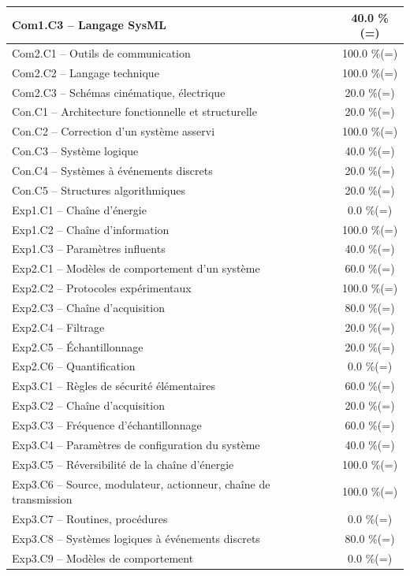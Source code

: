 \begin{center}
\begin{tabular}{|p{.7\linewidth}|c|}
Com1.C3 -- Langage SysML&40.0 \%(=)\\ \hline 
Com2.C1 -- Outils de communication&100.0 \%(=)\\ \hline 
Com2.C2 -- Langage technique&100.0 \%(=)\\ \hline 
Com2.C3 -- Schémas cinématique, électrique&20.0 \%(=)\\ \hline 
Con.C1 -- Architecture fonctionnelle et structurelle&20.0 \%(=)\\ \hline 
Con.C2 -- Correction d’un système asservi&100.0 \%(=)\\ \hline 
Con.C3 -- Système logique&40.0 \%(=)\\ \hline 
Con.C4 -- Systèmes à événements discrets&20.0 \%(=)\\ \hline 
Con.C5 -- Structures algorithmiques&20.0 \%(=)\\ \hline 
Exp1.C1 -- Chaîne d’énergie&0.0 \%(=)\\ \hline 
Exp1.C2 -- Chaîne d’information&100.0 \%(=)\\ \hline 
Exp1.C3 -- Paramètres influents&40.0 \%(=)\\ \hline 
Exp2.C1 -- Modèles de comportement d’un système&60.0 \%(=)\\ \hline 
Exp2.C2 -- Protocoles expérimentaux&100.0 \%(=)\\ \hline 
Exp2.C3 -- Chaîne d’acquisition&80.0 \%(=)\\ \hline 
Exp2.C4 -- Filtrage&20.0 \%(=)\\ \hline 
Exp2.C5 -- Échantillonnage&20.0 \%(=)\\ \hline 
Exp2.C6 -- Quantification&0.0 \%(=)\\ \hline 
Exp3.C1 -- Règles de sécurité élémentaires&60.0 \%(=)\\ \hline 
Exp3.C2 -- Chaîne d'acquisition&20.0 \%(=)\\ \hline 
Exp3.C3 -- Fréquence d’échantillonnage&60.0 \%(=)\\ \hline 
Exp3.C4 -- Paramètres de configuration du système&40.0 \%(=)\\ \hline 
Exp3.C5 -- Réversibilité de la chaîne d’énergie&100.0 \%(=)\\ \hline 
Exp3.C6 -- Source, modulateur, actionneur, chaîne de transmission&100.0 \%(=)\\ \hline 
Exp3.C7 -- Routines, procédures &0.0 \%(=)\\ \hline 
Exp3.C8 -- Systèmes logiques à événements discrets&80.0 \%(=)\\ \hline 
Exp3.C9 -- Modèles de comportement&0.0 \%(=)\\ \hline 

\end{tabular}
\end{center}
